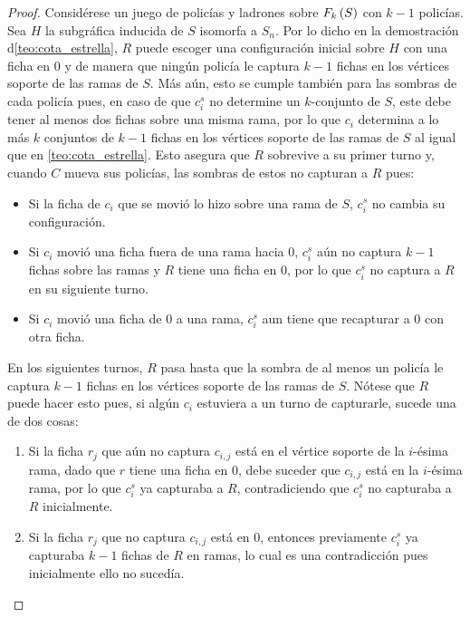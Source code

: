 \begin{proof}
    Consid\'erese un juego de polic\'ias y ladrones sobre $F_{k}\left( S\right)$ con $k-1$
    polic\'ias. Sea $H$ la subgr\'afica inducida de $S$ isomorfa a $S_n$. Por lo
    dicho en la demostraci\'on d\cref{teo:cota_estrella}, $R$ puede escoger una
    configuraci\'on inicial sobre $H$ con una ficha en $0$ y de manera que
    ning\'un polic\'ia le captura $k-1$ fichas en los v\'ertices soporte de las
    ramas de $S$. M\'as a\'un, esto se cumple tambi\'en para las sombras de cada
    polic\'ia pues, en caso de que $c_{i}^s$ no determine un $k$-conjunto de
    $S$, este debe tener al menos dos fichas sobre una misma rama, por lo que
    $c_i$ determina a lo m\'as $k$ conjuntos de $k-1$ fichas en los v\'ertices
    soporte de las ramas de $S$ al igual que en \cref{teo:cota_estrella}. Esto
    asegura que $R$ sobrevive a su primer turno y, cuando $C$ mueva sus
    polic\'ias, las sombras de estos no capturan a $R$ pues:
    \begin{itemize}
        \item Si la ficha de $c_i$ que se movi\'o lo hizo
        sobre una rama de $S$, $c_i^s$ no cambia su configuraci\'on.
        \item Si $c_i$ movi\'o una ficha fuera de una rama hacia $0$, $c_i^s$
        a\'un no captura $k-1$ fichas sobre las ramas y $R$ tiene una ficha en
        $0$, por lo que $c_i^s$ no captura a $R$ en su siguiente turno.
        \item Si $c_i$ movi\'o una ficha de $0$ a una rama, $c_i^s$ aun tiene
        que recapturar a $0$ con otra ficha.
    \end{itemize}

    En los siguientes turnos, $R$ pasa hasta que la sombra de al menos un
    polic\'ia le captura $k-1$ fichas en los v\'ertices soporte de las ramas de
    $S$. N\'otese que $R$ puede hacer esto pues, si alg\'un $c_i$ estuviera a un
    turno de capturarle, sucede una de dos cosas:
    \begin{enumerate}
        \item Si la ficha $r_j$ que a\'un no captura $c_{i,j}$ est\'a en el
        v\'ertice soporte de la $i$-\'esima rama, dado que $r$ tiene una ficha
        en $0$, debe suceder que $c_{i,j}$ est\'a en la $i$-\'esima rama, por lo
        que $c_{i}^s$ ya capturaba a $R$, contradiciendo que $c_{i}^s$ no
        capturaba a $R$ inicialmente.

        \item Si la ficha $r_j$ que no captura $c_{i,j}$ est\'a en $0$, entonces
        previamente $c_i^s$ ya capturaba $k-1$ fichas de $R$ en ramas, lo cual
        es una contradicci\'on pues inicialmente ello no suced\'ia.
    \end{enumerate}


\end{proof}
